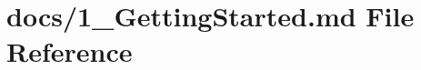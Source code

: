 \hypertarget{1___getting_started_8md}{}\section{docs/1\+\_\+\+Getting\+Started.md File Reference}
\label{1___getting_started_8md}
